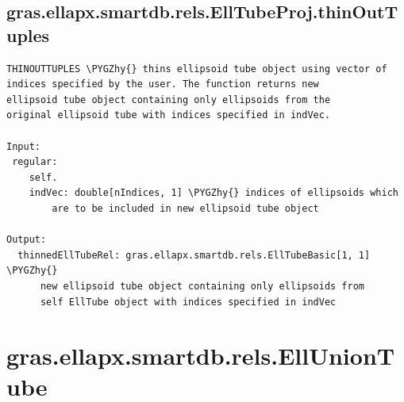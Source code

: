 \documentclass[letterpaper,10pt,english]{sphinxmanual}
\def\PYGZhy{\char`\-}
\begin{document}
\subsection{gras.ellapx.smartdb.rels.EllTubeProj.thinOutTuples}
\label{chap_functions:gras-ellapx-smartdb-rels-elltubeproj-thinouttuples}
\begin{Verbatim}[commandchars=\\\{\}]
THINOUTTUPLES \PYGZhy{} thins ellipsoid tube object using vector of
indices specified by the user. The function returns new
ellipsoid tube object containing only ellipsoids from the
original ellipsoid tube with indices specified in indVec.

Input:
 regular:
    self.
    indVec: double[nIndices, 1] \PYGZhy{} indices of ellipsoids which
        are to be included in new ellipsoid tube object

Output:
  thinnedEllTubeRel: gras.ellapx.smartdb.rels.EllTubeBasic[1, 1] \PYGZhy{}
      new ellipsoid tube object containing only ellipsoids from
      self EllTube object with indices specified in indVec
\end{Verbatim}


\section{gras.ellapx.smartdb.rels.EllUnionTube}
\label{chap_functions:gras-ellapx-smartdb-rels-elluniontube}
\end{document}
